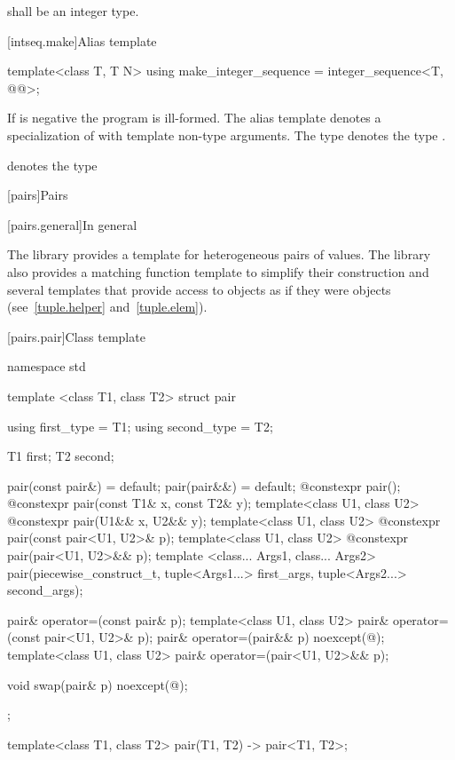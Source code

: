\pnum
{} shall be an integer type.

[intseq.make]{Alias template }

%
\begin{itemdecl}
template<class T, T N>
  using make_integer_sequence = integer_sequence<T, @\seebelow{}@>;
\end{itemdecl}

\begin{itemdescr}
\pnum
If  is negative the program is ill-formed. The alias template
 denotes a specialization of
 with  template non-type arguments.
The type  denotes the type
.
\begin{note}  denotes the type
 \end{note}
\end{itemdescr}

[pairs]{Pairs}

[pairs.general]{In general}

\pnum
The library provides a template for heterogeneous pairs of values.
The library also provides a matching function template to simplify
their construction and several templates that provide access to 
objects as if they were  objects (see~\ref{tuple.helper}
and~\ref{tuple.elem}).%
%
%
%

[pairs.pair]{Class template }

%
\begin{codeblock}
namespace std {
  template <class T1, class T2>
    struct pair {
      using first_type  = T1;
      using second_type = T2;

      T1 first;
      T2 second;

      pair(const pair&) = default;
      pair(pair&&) = default;
      @\EXPLICIT@ constexpr pair();
      @\EXPLICIT@ constexpr pair(const T1& x, const T2& y);
      template<class U1, class U2> @\EXPLICIT@ constexpr pair(U1&& x, U2&& y);
      template<class U1, class U2> @\EXPLICIT@ constexpr pair(const pair<U1, U2>& p);
      template<class U1, class U2> @\EXPLICIT@ constexpr pair(pair<U1, U2>&& p);
      template <class... Args1, class... Args2>
        pair(piecewise_construct_t, tuple<Args1...> first_args, tuple<Args2...> second_args);

      pair& operator=(const pair& p);
      template<class U1, class U2> pair& operator=(const pair<U1, U2>& p);
      pair& operator=(pair&& p) noexcept(@\seebelow@);
      template<class U1, class U2> pair& operator=(pair<U1, U2>&& p);

      void swap(pair& p) noexcept(@\seebelow@);
    };

  template<class T1, class T2>
    pair(T1, T2) -> pair<T1, T2>;
}
\end{codeblock}

